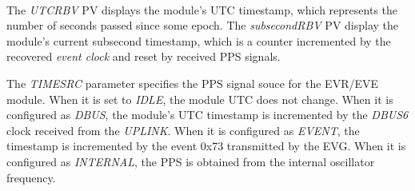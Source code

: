 \documentclass[openany]{article}
\begin{document}
			\paragraph{} The \emph{UTCRBV} PV displays the module's UTC timestamp, which represents the number of seconds passed since some epoch. The \emph{subsecondRBV} PV display the module's current subsecond timestamp, which is a counter incremented by the recovered \emph{event clock} and reset by received PPS signals.
			\par The \emph{TIMESRC} parameter specifies the PPS signal souce for the EVR/EVE module. When it is set to \emph{IDLE}, the module UTC does not change. When it is configured as \emph{DBUS}, the module's UTC timestamp is incremented by the \emph{DBUS6} clock received from the \emph{UPLINK}. When it is configured as \emph{EVENT}, the timestamp is incremented by the event 0x73 transmitted by the EVG. When it is configured as \emph{INTERNAL}, the PPS is obtained from the internal oscillator frequency.
\end{document}
